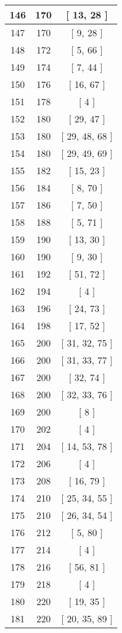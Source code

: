 \begin{center}
\begin{longtable}[H]{|| c c c ||}
\hline
146 & 170 & [ 13, 28 ] \\ 
\hline
147 & 170 & [ 9, 28 ] \\ 
\hline
148 & 172 & [ 5, 66 ] \\ 
\hline
149 & 174 & [ 7, 44 ] \\ 
\hline
150 & 176 & [ 16, 67 ] \\ 
\hline
151 & 178 & [ 4 ] \\ 
\hline
152 & 180 & [ 29, 47 ] \\ 
\hline
153 & 180 & [ 29, 48, 68 ] \\ 
\hline
154 & 180 & [ 29, 49, 69 ] \\ 
\hline
155 & 182 & [ 15, 23 ] \\ 
\hline
156 & 184 & [ 8, 70 ] \\ 
\hline
157 & 186 & [ 7, 50 ] \\ 
\hline
158 & 188 & [ 5, 71 ] \\ 
\hline
159 & 190 & [ 13, 30 ] \\ 
\hline
160 & 190 & [ 9, 30 ] \\ 
\hline
161 & 192 & [ 51, 72 ] \\ 
\hline
162 & 194 & [ 4 ] \\ 
\hline
163 & 196 & [ 24, 73 ] \\ 
\hline
164 & 198 & [ 17, 52 ] \\ 
\hline
165 & 200 & [ 31, 32, 75 ] \\ 
\hline
166 & 200 & [ 31, 33, 77 ] \\ 
\hline
167 & 200 & [ 32, 74 ] \\ 
\hline
168 & 200 & [ 32, 33, 76 ] \\ 
\hline
169 & 200 & [ 8 ] \\ 
\hline
170 & 202 & [ 4 ] \\ 
\hline
171 & 204 & [ 14, 53, 78 ] \\ 
\hline
172 & 206 & [ 4 ] \\ 
\hline
173 & 208 & [ 16, 79 ] \\ 
\hline
174 & 210 & [ 25, 34, 55 ] \\ 
\hline
175 & 210 & [ 26, 34, 54 ] \\ 
\hline
176 & 212 & [ 5, 80 ] \\ 
\hline
177 & 214 & [ 4 ] \\ 
\hline
178 & 216 & [ 56, 81 ] \\ 
\hline
179 & 218 & [ 4 ] \\ 
\hline
180 & 220 & [ 19, 35 ] \\ 
\hline
181 & 220 & [ 20, 35, 89 ] \\ 

\end{longtable}
\end{center}
